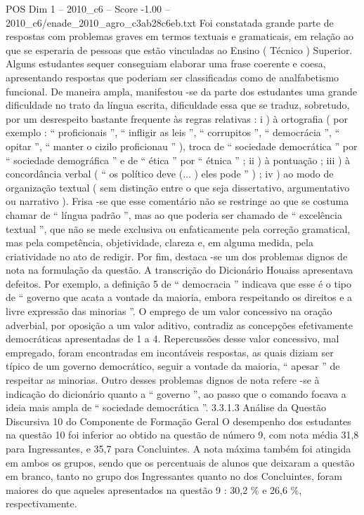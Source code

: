\begin{textsample}{POS Dim 1 – 2010\_c6 – Score -1.00 – 2010\_c6/enade\_2010\_agro\_c3ab28c6eb.txt}
Foi constatada grande parte de respostas com problemas graves em termos textuais e gramaticais, em relação ao que se esperaria de pessoas que estão vinculadas ao Ensino ( Técnico ) Superior.
Alguns estudantes sequer conseguiam elaborar uma frase coerente e coesa, apresentando respostas que poderiam ser classificadas como de analfabetismo funcional.
De maneira ampla, manifestou -se da parte dos estudantes uma grande dificuldade no trato da língua escrita, dificuldade essa que se traduz, sobretudo, por um desrespeito bastante frequente às regras relativas : i ) à ortografia ( por exemplo : “ proficionais ”, “ infligir as leis ”, “ corrupitos ”, “ democrácia ”, “ opitar ”, “ manter o cizilo proficionau ” ), troca de “ sociedade democrática ” por “ sociedade demográfica ” e de “ ética ” por “ étnica ” ; ii ) à pontuação ; iii ) à concordância verbal ( “ os político deve (... ) eles pode ” ) ; iv ) ao modo de organização textual ( sem distinção entre o que seja dissertativo, argumentativo ou narrativo ).
Frisa -se que esse comentário não se restringe ao que se costuma chamar de “ língua padrão ”, mas ao que poderia ser chamado de “ excelência textual ”, que não se mede exclusiva ou enfaticamente pela correção gramatical, mas pela competência, objetividade, clareza e, em alguma medida, pela criatividade no ato de redigir.
Por fim, destaca -se um dos problemas dignos de nota na formulação da questão.
A transcrição do Dicionário Houaiss apresentava defeitos.
Por exemplo, a definição 5 de “ democracia ” indicava que esse é o tipo de “ governo que acata a vontade da maioria, embora respeitando os direitos e a livre expressão das minorias ”.
O emprego de um valor concessivo na oração adverbial, por oposição a um valor aditivo, contradiz as concepções efetivamente democráticas apresentadas de 1 a 4.
Repercussões desse valor concessivo, mal empregado, foram encontradas em incontáveis respostas, as quais diziam ser típico de um governo democrático, seguir a vontade da maioria, “ apesar ” de respeitar as minorias.
Outro desses problemas dignos de nota refere -se à indicação do dicionário quanto a “ governo ”, ao passo que o comando focava a ideia mais ampla de “ sociedade democrática ”. 3.3.1.3 Análise da Questão Discursiva 10 do Componente de Formação Geral O desempenho dos estudantes na questão 10 foi inferior ao obtido na questão de número 9, com nota média 31,8 para Ingressantes, e 35,7 para Concluintes.
A nota máxima também foi atingida em ambos os grupos, sendo que os percentuais de alunos que deixaram a questão em branco, tanto no grupo dos Ingressantes quanto no dos Concluintes, foram maiores do que aqueles apresentados na questão 9 : 30,2 \% e 26,6 \%, respectivamente.

\end{textsample}
